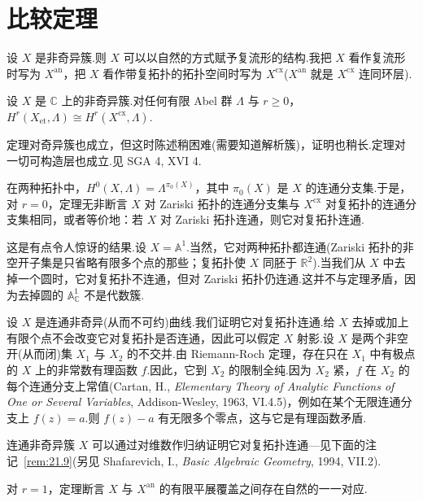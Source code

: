 ﻿%
\chapter{比较定理}\label{sec:21}

设 $X$ 是非奇异簇.则 $X$ 可以以自然的方式赋予复流形的结构.我把 $X$ 看作复流形时写为 $X^{\mathrm{an}}$，把 $X$ 看作带复拓扑的拓扑空间时写为 $X^{\mathrm{cx}}$($X^{\mathrm{an}}$ 就是 $X^{\mathrm{cx}}$ 连同环层).

\begin{theorem}\label{thm:21.1}
设 $X$ 是 $\mathbb{C}$ 上的非奇异簇.对任何有限 Abel 群 $\Lambda$ 与 $r \geq 0$，$H^{r}(X_{\mathrm{et}}, \Lambda) \cong H^{r}(X^{\mathrm{cx}}, \Lambda)$.
\end{theorem}

\begin{remark}\label{rem:21.2}
定理对奇异簇也成立，但这时陈述稍困难(需要知道解析簇)，证明也稍长.定理对一切可构造层也成立.见 SGA 4, XVI 4.

在两种拓扑中，$H^{0}(X, \Lambda) = \Lambda^{\pi_0(X)}$，其中 $\pi_0(X)$ 是 $X$ 的连通分支集.于是，对 $r = 0$，定理无非断言 $X$ 对 Zariski 拓扑的连通分支集与 $X^{\mathrm{cx}}$ 对复拓扑的连通分支集相同，或者等价地：若 $X$ 对 Zariski 拓扑连通，则它对复拓扑连通.

这是有点令人惊讶的结果.设 $X = \mathbb{A}^{1}$.当然，它对两种拓扑都连通(Zariski 拓扑的非空开子集是只省略有限多个点的那些；复拓扑使 $X$ 同胚于 $\mathbb{R}^{2}$).当我们从 $X$ 中去掉一个圆时，它对复拓扑不连通，但对 Zariski 拓扑仍连通.这并不与定理矛盾，因为去掉圆的 $\mathbb{A}^{1}_{\mathbb{C}}$ 不是代数簇.

设 $X$ 是连通非奇异(从而不可约)曲线.我们证明它对复拓扑连通.给 $X$ 去掉或加上有限个点不会改变它对复拓扑是否连通，因此可以假定 $X$ 射影.设 $X$ 是两个非空开(从而闭)集 $X_1$ 与 $X_2$ 的不交并.由 Riemann-Roch 定理，存在只在 $X_1$ 中有极点的 $X$ 上的非常数有理函数 $f$.因此，它到 $X_2$ 的限制全纯.因为 $X_2$ 紧，$f$ 在 $X_2$ 的每个连通分支上常值(Cartan, H., \emph{Elementary Theory of Analytic Functions of One or Several Variables}, Addison-Wesley, 1963, VI.4.5)，例如在某个无限连通分支上 $f(z) = a$.则 $f(z) - a$ 有无限多个零点，这与它是有理函数矛盾.

连通非奇异簇 $X$ 可以通过对维数作归纳证明它对复拓扑连通---见下面的注记~\ref{rem:21.9}(另见 Shafarevich, I., \emph{Basic Algebraic Geometry}, 1994, VII.2).

对 $r = 1$，定理断言 $X$ 与 $X^{\mathrm{an}}$ 的有限平展覆盖之间存在自然的一一对应.
\end{remark}

